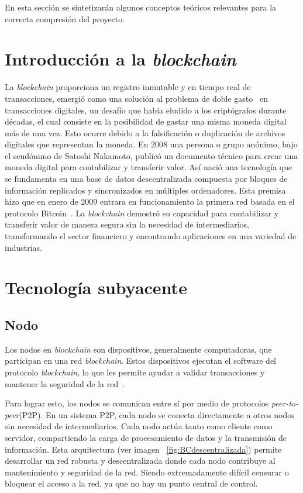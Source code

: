 
En esta sección se sintetizarán algunos conceptos teóricos relevantes para la correcta compresión del proyecto.

\section{Introducción a la \textit{blockchain}}

La \textit{blockchain} proporciona un registro inmutable y en tiempo real de transacciones, emergió como una solución al problema de doble gasto~\cite{dobleGasto} en transacciones digitales, un desafío que había eludido a los criptógrafos durante décadas, el cual consiste en la posibilidad de gastar una misma moneda digital más de una vez. Esto ocurre debido a la falsificación o duplicación de archivos digitales que representan la moneda.
En 2008 una persona o grupo anónimo, bajo el seudónimo de Satoshi Nakamoto, publicó un documento técnico para crear una moneda digital para contabilizar y transferir valor. Así nació una tecnología que se fundamenta en una base de datos descentralizada compuesta por bloques de información replicados y sincronizados en múltiples ordenadores.  
Esta premisa hizo que en enero de 2009 entrara en funcionamiento la primera red basada en el protocolo Bitcoin~\cite{introducciónBitcoin}.
La \textit{blockchain} demostró su capacidad para contabilizar y transferir valor de manera segura sin la necesidad de intermediarios, transformando el sector financiero y encontrando aplicaciones en una variedad de industrias.



\section{Tecnología subyacente}


\subsection{Nodo}

Los nodos en \textit{blockchain} son dispositivos, generalmente computadoras, que participan en una red \textit{blockchain}. Estos dispositivos ejecutan el software del protocolo \textit{blockchain}, lo que les permite ayudar a validar transacciones y mantener la seguridad de la red~\cite{IntroducciónNodo}.

Para lograr esto, los nodos se comunican entre sí por medio de protocolos \textit{peer-to-peer}(P2P). En un sistema P2P, cada nodo se conecta directamente a otros nodos sin necesidad de intermediarios. Cada nodo actúa tanto como cliente como servidor, compartiendo la carga de procesamiento de datos y la transmisión de información.
Esta arquitectura (ver imagen ~\ref{fig:BCdescentralizada}) permite desarrollar un red robusta y descentralizada donde cada nodo contribuye al mantenimiento y seguridad de la red. Siendo extremadamente difícil censurar o bloquear el acceso a la red, ya que no hay un punto central de control.

